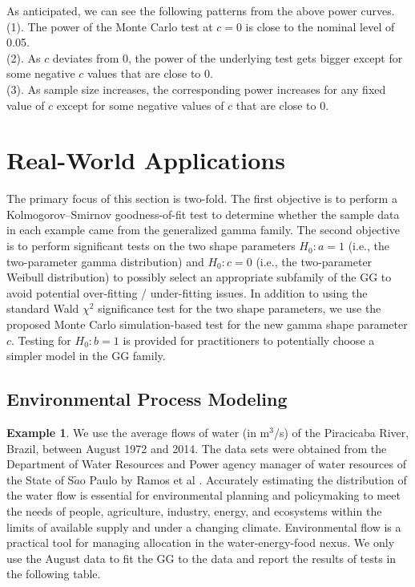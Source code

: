 \documentclass{ps}
\theoremstyle{plain}%
\theoremstyle{definition}
\theoremstyle{remark}
\begin{document}
\noindent As anticipated, we can see the following patterns from the above power curves.\\
(1). The power of the Monte Carlo test at $c = 0$ is close to the nominal level of 0.05.\\
(2). As $c$ deviates from 0, the power of the underlying test gets bigger except for some negative $c$ values that are close to 0.\\
(3). As sample size increases, the corresponding power increases for any fixed value of $c$ except for some negative values of $c$ that are close to 0.

\section{Real-World Applications}\label{sec09:Numerical-examples}

The primary focus of this section is two-fold. The first objective is to perform a Kolmogorov–Smirnov goodness-of-fit test to determine whether the sample data in each example came from the generalized gamma family. The second objective is to perform significant tests on the two shape parameters $H_0: a = 1$ (i.e., the two-parameter gamma distribution) and $H_0: c = 0$ (i.e., the two-parameter Weibull distribution) to possibly select an appropriate subfamily of the GG to avoid potential over-fitting / under-fitting issues. In addition to using the standard Wald $\chi^2$ significance test for the two shape parameters, we use the proposed Monte Carlo simulation-based test for the new gamma shape parameter $c$. Testing for $H_0: b = 1$ is provided for practitioners to potentially choose a simpler model in the GG family. 


\subsection{Environmental Process Modeling}

{\bf Example 1}. We use the average flows of water (in m$^3$/s) of the Piracicaba River, Brazil, between August 1972 and 2014. The data sets were obtained from the Department of Water Resources and Power agency manager of water resources of the State of S$\tilde{a}$o Paulo by Ramos et al  \cite{Ramos-et-al-2021}.  Accurately estimating the distribution of the water flow is essential for environmental planning and policymaking to meet the needs of people, agriculture, industry, energy, and ecosystems within the limits of available supply and under a changing climate. Environmental flow is a practical tool for managing allocation in the water-energy-food nexus. We only use the August data to fit the GG to the data and report the results of tests in the following table.
\end{document}
